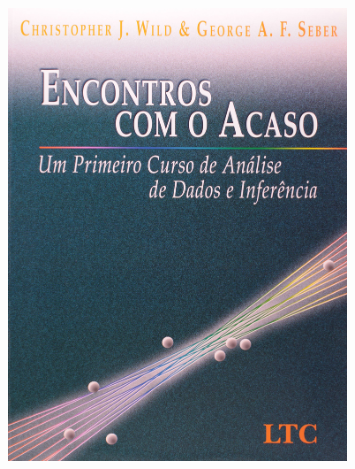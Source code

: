 \documentclass[handout,serif, professionalfont, usenames, dvipsnames, aspectratio = 169]{beamer}\usepackage[]{graphicx}\usepackage[]{color}
\begin{document}
\begin{frame}
\begin{figure}
\begin{minipage}{.33\textwidth}
  \label{fig:wild+seber}
\end{minipage}
\begin{minipage}{.33\textwidth}
  \centering
  \includegraphics[width=0.8\textwidth]{./pics/EncontrosAcaso.jpg}
  \label{fig:wild+seber+pt}
\end{minipage}
\end{figure}
\nocite{wild+seber:2000,wild+seber:2004,utts:2005}
\end{frame}

\end{document}
